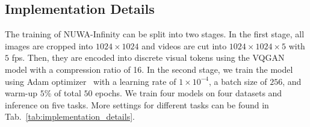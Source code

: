 \documentclass{article}
\begin{document}
\subsection{Implementation Details}\label{sub:imp}


The training of NUWA-Infinity can be split into two stages. In the first stage, all images are cropped into $1024 \times 1024$ and videos are cut into $1024 \times 1024 \times 5$ with $5$ fps. Then, they are encoded into discrete visual tokens using the VQGAN model
with a compression ratio of 16. 
In the second stage, we train the model using Adam optimizer~\cite{kingmaAdamMethodStochastic2014} with a learning rate of $1 \times 10^{-4}$, a batch size of $256$, and warm-up $5$\% of total $50$ epochs. We train four models on four datasets and inference on five tasks. More settings for different tasks can be found in Tab.~\ref{tab:implementation_details}. 
\end{document}
